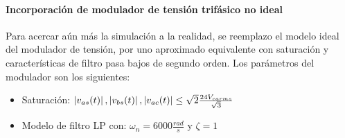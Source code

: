 \documentclass[a4paper, 10pt, onecolumn,journal]{ieeeconf}
\begin{document}
\paragraph{\textbf{Incorporación de modulador de tensión trifásico no ideal}} Para acercar aún más la simulación a la realidad, se reemplazo el modelo ideal del modulador de tensión, por uno aproximado equivalente con saturación y características de filtro pasa bajos de segundo orden. Los parámetros del modulador son los siguientes:
\begin{itemize}
	\item Saturación: $\left| v_{as}(t)\right|,\left| v_{bs}(t)\right|,\left| v_{ac}(t)\right| \leq \sqrt{2} \frac{24 V_{ca \space rms}}{\sqrt{3}} $
	\item Modelo de filtro LP con: $\omega_n = 6000 \frac{rad}{s} $ y $\zeta = 1$ 
\end{itemize}
\end{document}
